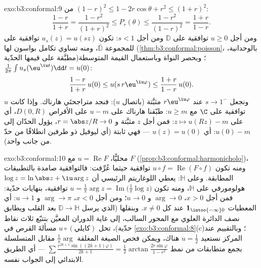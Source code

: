 \begin{solution}{exo:b3:conformal:9}
من $(1-r)^2 \leq 1 - 2r\cos\theta + r^2 \leq (1+r)^2$:
\[
\frac{1-r}{1+r} = \frac{1 - r^2}{(1+r)^2} \leq P_r(\theta)
\leq \frac{1 - r^2}{(1 - r)^2} = \frac{1+r}{1-r} .
\]
ومن أجل $u \geq 0$ توافقية على $\mathbb D$ ومن أجل $s < 1$:
تكون $u_s(z) =
u(sz)$ توافقية على  للمجموعة $\bar{\mathbb D}$، ومنه تساوي
تكامل بواسون لها (\cref{thm:b3:conformal:poisson}، بالوحدانية، مطبَّقة على قيمها
الحدّية)؛ وبحصر النواة وباستعمال القيمة المتوسطة $\frac1{2\pi}\int u_s(\eu^{\iu t})\dd t = u(0)$:
\[
\frac{1-r}{1+r}\,u(0) \leq u(s\,r\eu^{\iu\varphi}) \leq
\frac{1+r}{1-r}\,u(0).
\]
ونجعل $s \to 1^-$ عند $r\eu^{\iu\varphi}$ مثبَّتة (باتصال $u$): فنجد
متراجحتَي هارناك. وإذا كانت $u$ توافقية على $\C$ مع $u \geq m$:
طبّقنا هارناك على $u - m$ على الأقراص $D(0, R)$، أي على $z \mapsto u(Rz) - m$:
فمن أجل $z$ مثبَّتة و $r =
\abs z/R \to 0$، يؤول الحدّان إلى $u(0) - m$: أي
$u(z) =
u(0)$ --- فهي ثابتة (أي ليوفيل ذو طرفين انطلاقًا من حدّ من
جانب واحد).
\end{solution}

\begin{solution}{exo:b3:conformal:10}
محليًّا، $u = \operatorname{Re}F$ مع $F$  (\cref{prop:b3:conformal:harmonicholo})، ومنه تكون
$u\circ f =
\operatorname{Re}(F\circ f)$ توافقية حيثما عُرِّفت: فالتوافقية صامدة بالتطبيقات
المطابقة. وعلى $\mathbb H$: يعطي اللوغاريتم الرئيسي أن $\log z = \ln\abs z + \iu\arg z$
هولومورفي على $\mathbb H$، ومنه تكون $u = \frac1\pi\arg z =
\operatorname{Im}\bigl(\frac1\pi\log z\bigr)$ توافقية، بنهايات
حدّية: فمن أجل $x > 0$، $\arg \to 0$ و $u \to 0$؛ ومن أجل
$x < 0$، $\arg \to \pi$ و $u \to 1$: أي المعطيات $\mathbf
1_{\intoo{-\infty}0}$ عند كل
$x \neq 0$. وبنقلها  (الذي يرسل $\mathbb D \to \mathbb H$ بعد القلب
ويطابق نصف الدائرة العلوي مع المحور السالب، إلى غاية الدوران
المعيَّن بتتبّع ثلاث نقاط حدّية)، تحل $u\circ(\text{كايلي})$ مسألةَ القرص في
\cref{exo:b3:conformal:8}(c)؛ وبالتقييم عند المركز نستعيد $u = \frac12$ هناك،
ويمكن فحص الصيغة المغلقة $\frac1\pi\arg$ مقابل المتسلسلة بجمع
متطابقات من نمط $\sum\frac{r^{2k+1}\sin((2k+1)\varphi)}{2k+1} =
\frac12\arctan\frac{2r\sin\varphi}{1 - r^2}$ --- أي الطريق الابتدائي إلى الجواب
نفسه.
\end{solution}

